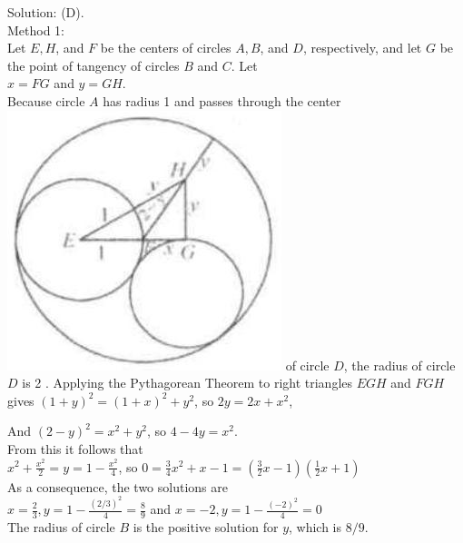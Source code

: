 \documentclass[10pt]{article}
\begin{document}
Solution: (D).\\
Method 1:\\
Let \(E, H\), and \(F\) be the centers of circles \(A, B\), and \(D\), respectively, and let \(G\) be the point of tangency of circles \(B\) and \(C\). Let\\
\(x=F G\) and \(y=G H\).\\
Because circle \(A\) has radius 1 and passes through the center\\
\includegraphics[max width=\textwidth]{2025_04_17_97bc1f7e44d93c271a88g-180(2)} of circle \(D\), the radius of circle \(D\) is 2 . Applying the Pythagorean Theorem to right triangles \(E G H\) and \(F G H\) gives \((1+y)^{2}=(1+x)^{2}+y^{2}\), so \(2 y=2 x+x^{2}\),


And \((2-y)^{2}=x^{2}+y^{2}\), so \(4-4 y=x^{2}\).\\
From this it follows that\\
\(x^{2}+\frac{x^{2}}{2}=y=1-\frac{x^{2}}{4}\), so \(0=\frac{3}{4} x^{2}+x-1=\left(\frac{3}{2} x-1\right)\left(\frac{1}{2} x+1\right)\)\\
As a consequence, the two solutions are\\
\(x=\frac{2}{3}, y=1-\frac{(2 / 3)^{2}}{4}=\frac{8}{9}\) and \(x=-2, y=1-\frac{(-2)^{2}}{4}=0\)\\
The radius of circle \(B\) is the positive solution for \(y\), which is \(8 / 9\).
\end{document}
